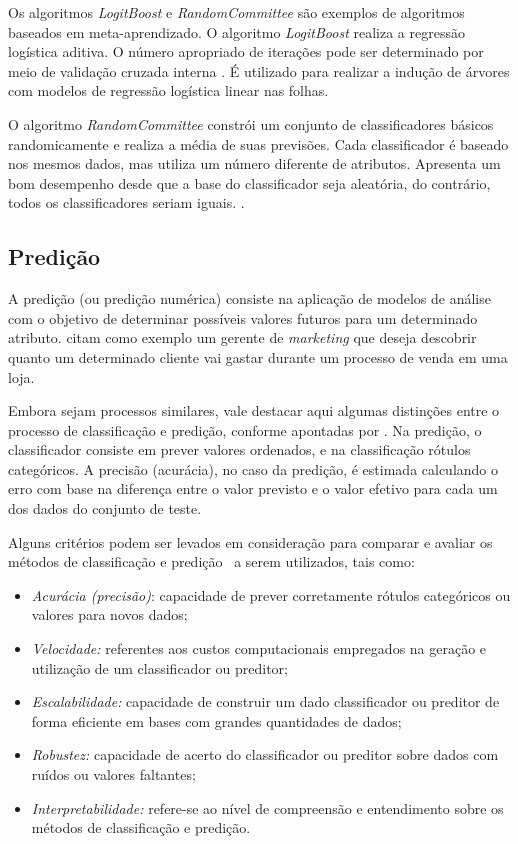 Os algoritmos \textit{LogitBoost} e \textit{RandomCommittee} são exemplos de algoritmos baseados em meta-aprendizado. O algoritmo \textit{LogitBoost} realiza a regressão logística aditiva. O número apropriado de iterações pode ser determinado por meio de validação cruzada interna \citep{witten2005}. É utilizado para realizar a indução de árvores com modelos de regressão logística linear nas folhas.

O algoritmo \textit{RandomCommittee} constrói um conjunto de classificadores básicos randomicamente e realiza a média de suas previsões. Cada classificador é baseado nos mesmos dados, mas utiliza um número diferente de atributos. Apresenta um bom desempenho desde que a base do classificador seja aleatória, do contrário, todos os classificadores seriam iguais. \citep{witten2005}. 




\subsection{Predição} \label{3subtitle2}

A predição (ou predição numérica) consiste na aplicação de modelos de análise com o objetivo de determinar possíveis valores futuros para um determinado atributo. \citet{han_kamber2006} citam como exemplo um gerente de \textit{marketing} que deseja descobrir quanto um determinado cliente vai gastar durante um processo de venda em uma loja. 

Embora sejam processos similares, vale destacar aqui algumas distinções entre o processo de classificação e predição, conforme apontadas por \citet{han_kamber2006}. Na predição, o classificador consiste em prever valores ordenados, e na classificação rótulos categóricos. A precisão (acurácia), no caso da predição, é estimada calculando o erro com base na diferença entre o valor previsto e o valor efetivo para cada um dos dados do conjunto de teste.

Alguns critérios podem ser levados em consideração para comparar e avaliar os métodos de classificação e predição~\citep{han_kamber2006} a serem utilizados, tais como:
\begin{itemize}
	\item \textit{Acurácia (precisão)}: capacidade de prever corretamente rótulos categóricos ou valores para novos dados;
	
	\item \textit{Velocidade:} referentes aos custos computacionais empregados na geração e utilização de um classificador ou preditor;
	
	\item \textit{Escalabilidade:} capacidade de construir um dado classificador ou preditor de forma eficiente em bases com grandes quantidades de dados;
	
	\item \textit{Robustez:} capacidade de acerto do classificador ou preditor sobre dados com ruídos ou valores faltantes;
	
	\item \textit{Interpretabilidade:} refere-se ao nível de compreensão e entendimento sobre os métodos de classificação e predição. 
\end{itemize}

